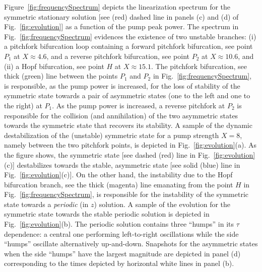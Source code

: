 Figure~\ref{fig:frequencySpectrum} depicts the linearization 
spectrum for the symmetric stationary
solution [see (red) dashed line in panels (c) and (d) of Fig.~\ref{fig:evolution}] 
as a function of the pump peak power.  
%
The spectrum in Fig.~\ref{fig:frequencySpectrum} evidences the existence of two 
unstable branches:
%
(i) a pitchfork bifurcation loop containing a forward pitchfork 
bifurcation, see point $P_1$ at $X\approx 4.6$, and a reverse pitchfork
bifurcation, see point $P_2$ at $X\approx 10.6$, and 
%
(ii) a Hopf bifurcation, see point $H$ at $X\approx 15.1$.
%
The pitchfork bifurcation, see thick (green) line between the 
points $P_1$ and $P_2$ in Fig.~\ref{fig:frequencySpectrum}, 
is responsible, as the pump power is increased, for the loss of stability of the 
symmetric state towards a pair of asymmetric states (one to the left and one to the 
right) at $P_1$. As the pump power is increased, a reverse pitchfork at $P_2$
is responsible for the collision (and annihilation) of the two asymmetric states 
towards the symmetric state that recovers its stability.
%
A sample of the dynamic destabilization of the (unstable) symmetric state
for a pump strength $X=8$, namely between the two pitchfork points, is depicted 
in Fig.~\ref{fig:evolution}(a). As the figure shows, the symmetric state 
[see dashed (red) line in Fig.~\ref{fig:evolution}(c)] destabilizes
towards the stable, asymmetric state [see solid (blue) line in
Fig.~\ref{fig:evolution}(c)].
%
On the other hand, the instability due to the Hopf bifurcation branch,
see the thick (magenta) line emanating from the point $H$ in
Fig.~\ref{fig:frequencySpectrum}, is responsible for the instability of
the symmetric state towards a {\em periodic} (in $z$) solution. A sample of the
evolution for the symmetric state towards the stable periodic solution
is depicted in Fig.~\ref{fig:evolution}(b). The periodic solution contains
three ``humps'' in its $\tau$ dependence: 
a central one performing left-to-right oscillations while
the side ``humps'' oscillate alternatively up-and-down. Snapshots for the
asymmetric states when the side ``humps'' have the largest magnitude are
depicted in panel (d) corresponding to the times depicted by horizontal
white lines in panel (b).

